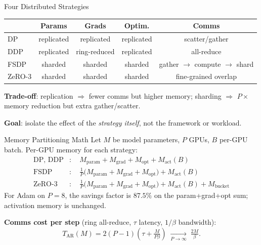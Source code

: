 \documentclass[10pt,aspectratio=169]{beamer}
\begin{document}
\begin{frame}{Four Distributed Strategies}
  \footnotesize
  \begin{tabular}{@{}lcccc@{}}
    \toprule
    & \textbf{Params} & \textbf{Grads} & \textbf{Optim.} & \textbf{Comms}\\
    \midrule
    DP             & replicated & replicated & replicated & scatter/gather\\
    DDP            & replicated & \alert{ring-reduced} & replicated & all-reduce\\
    FSDP           & \alert{sharded} & \alert{sharded} & \alert{sharded} & gather $\to$ compute $\to$ shard\\
    ZeRO-3         & \alert{sharded} & \alert{sharded} & \alert{sharded} & fine-grained overlap\\
    \bottomrule
  \end{tabular}
  \vspace{2ex}

  \textbf{Trade-off}: replication $\Rightarrow$ fewer comms but higher
  memory; sharding $\Rightarrow$ $P\times$ memory reduction but extra
  gather/scatter.
  \vspace{1ex}

  \textbf{Goal}: isolate the effect of the \emph{strategy itself},
  not the framework or workload.
\end{frame}

\begin{frame}{Memory Partitioning Math}
  Let $M$ be model parameters, $P$ GPUs, $B$ per-GPU batch.
  Per-GPU memory for each strategy:
  \begin{align*}
  \text{DP, DDP}  &: \quad M_{\text{param}} + M_{\text{grad}} + M_{\text{opt}} + M_{\text{act}}(B)\\
  \text{FSDP}     &: \quad \tfrac{1}{P}\bigl(M_{\text{param}} + M_{\text{grad}} + M_{\text{opt}}\bigr) + M_{\text{act}}(B)\\
  \text{ZeRO-3}   &: \quad \tfrac{1}{P}\bigl(M_{\text{param}} + M_{\text{grad}} + M_{\text{opt}}\bigr) + M_{\text{act}}(B) + M_{\text{bucket}}
  \end{align*}
  For Adam on $P{=}8$, the savings factor is $87.5\%$ on the
  param+grad+opt sum; activation memory is unchanged.
  \vspace{2ex}

  \textbf{Comms cost per step} (ring all-reduce, $\tau$ latency,
  $1/\beta$ bandwidth):
  \[
    T_{\text{AR}}(M) = 2(P{-}1)\!\left(\tau + \tfrac{M}{P\beta}\right)
    \;\xrightarrow[P\to\infty]{} \; \tfrac{2M}{\beta}.
  \]
\end{frame}
\end{document}
